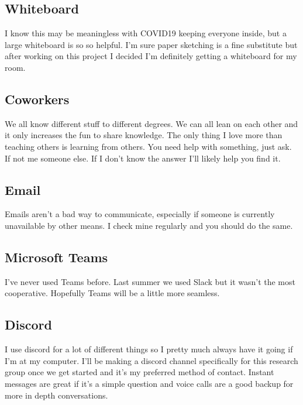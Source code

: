 \documentclass[prb,preprint]{revtex4-1}
\begin{document}
\subsection{Whiteboard}
I know this may be meaningless with COVID19 keeping everyone inside, but a large whiteboard is so so helpful. I'm sure paper sketching is a fine substitute but after working on this project I decided I'm definitely getting a whiteboard for my room.

\subsection{Coworkers}
We all know different stuff to different degrees. We can all lean on each other and it only increases the fun to share knowledge. The only thing I love more than teaching others is learning from others. You need help with something, just ask. If not me someone else. If I don't know the answer I'll likely help you find it.

\subsection{Email}
Emails aren't a bad way to communicate, especially if someone is currently unavailable by other means. I check mine regularly and you should do the same.

\subsection{Microsoft Teams}
I've never used Teams before. Last summer we used Slack but it wasn't the most cooperative. Hopefully Teams will be a little more seamless.

\subsection{Discord}
I use discord for a lot of different things so I pretty much always have it going if I'm at my computer. I'll be making a discord channel specifically for this research group once we get started and it's my preferred method of contact. Instant messages are great if it's a simple question and voice calls are a good backup for more in depth conversations.

\end{document}
